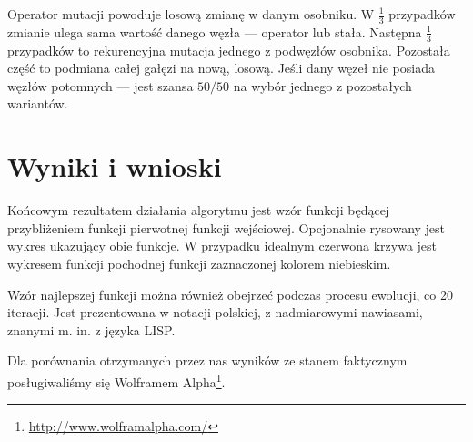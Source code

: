 \documentclass{classrep2}
\begin{document}
Operator mutacji powoduje losową zmianę w danym osobniku. W $\frac{1}{3}$ przypadków zmianie ulega sama wartość danego węzła --- operator lub stała. Następna $\frac{1}{3}$ przypadków to rekurencyjna mutacja jednego z podwęzłów osobnika. Pozostała część to podmiana całej gałęzi na nową, losową. Jeśli dany węzeł nie posiada węzłów potomnych --- jest szansa $50/50$ na wybór jednego z pozostałych wariantów.

\section {Wyniki i wnioski}
Końcowym rezultatem działania algorytmu jest wzór funkcji będącej przybliżeniem funkcji pierwotnej funkcji wejściowej. Opcjonalnie rysowany jest wykres ukazujący obie funkcje. W przypadku idealnym czerwona krzywa jest wykresem funkcji pochodnej funkcji zaznaczonej kolorem niebieskim.

Wzór najlepszej funkcji można również obejrzeć podczas procesu ewolucji, co 20 iteracji. Jest prezentowana w notacji polskiej, z nadmiarowymi nawiasami, znanymi m. in. z języka LISP.

Dla porównania otrzymanych przez nas wyników ze stanem faktycznym posługiwaliśmy się Wolframem Alpha\footnote{\url{http://www.wolframalpha.com/}}.
\end{document}
